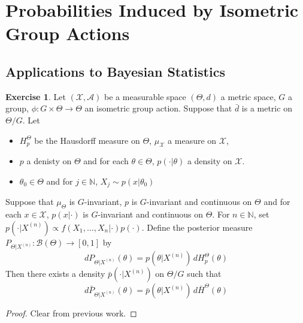 \documentclass[12pt]{amsart}
\theoremstyle{definition}
\newtheorem{ex}[definition]{Exercise}
\newcommand{\N}{\mathbb{N}}
\newcommand{\MA}{\mathcal{A}}
\newcommand{\MB}{\mathcal{B}}
\newcommand{\MX}{\mathcal{X}}
\begin{document}
	
	
	
	
	
	
	\newpage
	\section{Probabilities Induced by Isometric Group Actions}
	
	\subsection{Applications to Bayesian Statistics}
	
	\begin{ex}
	Let $(\MX, \MA)$ be a measurable space $(\Theta, d)$ a metric space, $G$ a group, $\phi: G \times \Theta \rightarrow \Theta$ an isometric group action. Suppose that $\bar{d}$ is a metric on $\Theta / G$. Let 
	\begin{itemize}
	\item $H_p^{\Theta}$ be the Hausdorff measure on $\Theta$, $\mu_{\MX}$ a measure on $\MX$, 
	\item $p$ a denisty on $\Theta$ and for each $\theta \in \Theta$, $p(\cdot|\theta)$ a density on $\MX$. 
	\item $\theta_0 \in \Theta$ and for $j \in \N$, $X_j \sim p(x|\theta_0)$
	\end{itemize}
	Suppose that $\mu_{\Theta}$ is $G$-invariant, $p$ is $G$-invariant and continuous on $\Theta$ and for each $x \in \MX$, $p(x| \cdot)$ is $G$-invariant and continuous on $\Theta$. For $n \in \N$, set $p(\cdot|X^{(n)}) \propto f(X_1, \ldots, X_n| \cdot) p(\cdot)$. Define the posterior measure $P_{\Theta|X^{(n)}}: \MB(\Theta) \rightarrow [0, 1]$ by 
	\begin{equation*}
	d P_{\Theta|X^{(n)}} (\theta) = p(\theta |X^{(n)}) \, dH_p^{\Theta} (\theta)
	\end{equation*}
	Then there exists a density $\bar{p}(\cdot|X^{(n)})$ on $\Theta / G$ such that 
	\begin{equation*}
	d \bar{P}_{\Theta|X^{(n)}}(\theta) = \bar{p}(\theta |X^{(n)}) \, d\bar{H}^{\Theta} (\theta)
	\end{equation*}
	\end{ex}
	
	\begin{proof}
	Clear from previous work.
	\end{proof}
	
\end{document}

